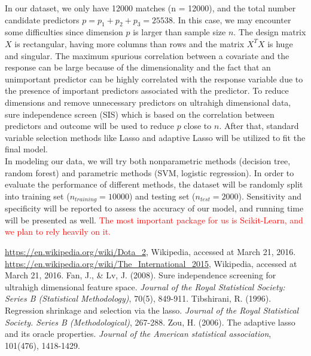 \documentclass[11pt]{article}
\begin{document}
\noindent In our dataset, we only have 12000 matches (n = 12000), and the total number candidate predictors $p = p_1 + p_2 + p_3 = 25538$. In this case, we may encounter some difficulties since dimension $p$ is larger than sample size $n$. The design matrix $X$ is rectangular, having more columns than rows and the matrix $X^TX$ is huge and singular. The maximum spurious correlation between a covariate and the response can be large because of the dimensionality and the fact that an unimportant predictor can be highly correlated with the response variable due to the presence of important predictors associated with the predictor. To reduce dimensions and remove unnecessary predictors on ultrahigh dimensional data, sure independence screen (SIS) which is based on the correlation between predictors and outcome \cite{SIS} will be used to reduce $p$ close to $n$. After that, standard variable selection methods like Lasso\cite{lasso} and adaptive Lasso\cite{adalasso} will be utilized to fit the final model. \\

\noindent In modeling our data, we will try both nonparametric methods (decision tree, random forest) and parametric methods (SVM, logistic regression). In order to evaluate the performance of different methods, the dataset will be randomly split into training set ($n_{training} = 10000$) and testing set ($n_{test} = 2000$). Sensitivity and specificity will be reported to assess the accuracy of our model, and running time will be presented as well. \textcolor{red}{The most important package for us is Scikit-Learn, and we plan to rely heavily on it.}
\begin{thebibliography}{9}
	 \url{https://en.wikipedia.org/wiki/Dota_2}, Wikipedia, accessed at March 21, 2016.
	 \url{https://en.wikipedia.org/wiki/The_International_2015}, Wikipedia, accessed at March 21, 2016.
	 Fan, J., \& Lv, J. (2008). Sure independence screening for ultrahigh dimensional feature space. \emph{Journal of the Royal Statistical Society: Series B (Statistical Methodology)}, 70(5), 849-911.
	 Tibshirani, R. (1996). Regression shrinkage and selection via the lasso. \emph{Journal of the Royal Statistical Society. Series B (Methodological)}, 267-288.
	 Zou, H. (2006). The adaptive lasso and its oracle properties. \emph{Journal of the American statistical association}, 101(476), 1418-1429.
\end{thebibliography}
\end{document}

